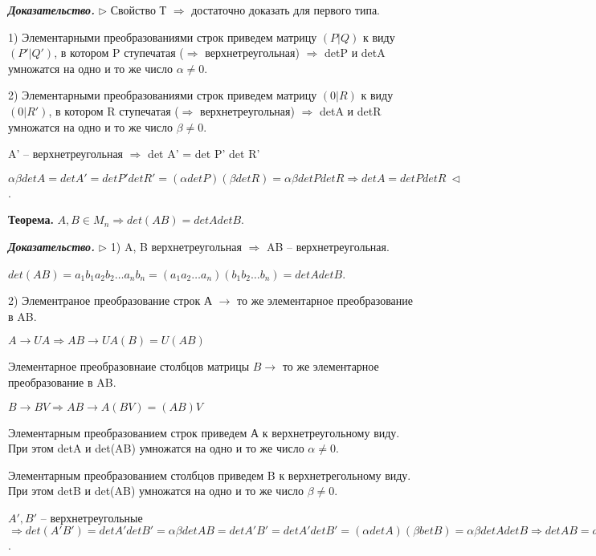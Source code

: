 \vspace{\baselineskip}
\textbf{\textit{Доказательство.}} $\rhd$ Свойство Т $\Rightarrow$ достаточно доказать для первого типа.

1) Элементарными преобразованиями строк приведем матрицу $(P|Q)$ к виду $(P'|Q')$, в котором P ступечатая ($\Rightarrow$ верхнетреугольная) $\Rightarrow$ detP и detA умножатся на одно и то же число $\alpha \neq 0$. 

2) Элементарными преобразованиями строк приведем матрицу $(0|R)$ к виду $(0|R')$, в котором R ступечатая ($\Rightarrow$ верхнетреугольная) $\Rightarrow$ detA и detR умножатся на одно и то же число $\beta \neq 0$. 

A' -- верхнетреугольная $\Rightarrow$ det A' = det P' det R'

$\alpha \beta det A = det A' = det P' det R' = (\alpha det P) (\beta det R) = \alpha \beta det P det R \Rightarrow det A = det P det R \ \lhd$.

\vspace{\baselineskip}
\textbf{Теорема.} $A, B \in M_n \Rightarrow det(AB) = detA detB$.

\vspace{\baselineskip}
\textbf{\textit{Доказательство.}} $\rhd$ 1) A, B верхнетреугольная $\Rightarrow$ AB -- верхнетреугольная.


$det(AB) = a_1 b_1 a_2 b_2 \dots a_n b_n = (a_1 a_2 \dots a_n)(b_1 b_2 \dots b_n) = det A det B$.

\vspace{\baselineskip}
2) Элементраное преобразование строк А $\rightarrow$ то же элементарное преобразование в AB.

$A \rightarrow UA \Rightarrow AB \rightarrow UA(B) = U(AB)$

Элементарное преобразовнаие столбцов матрицы $B \rightarrow$ то же элементарное преобразование в AB.

$B \rightarrow BV \Rightarrow AB \rightarrow A(BV) = (AB)V$

\vspace{\baselineskip}
Элементарным преобразованием строк приведем А к верхнетреугольному виду. При этом detA и det(AB) умножатся на одно и то же число $\alpha \neq 0$.

Элементарным преобразованием столбцов приведем B к верхнетрегольному виду. При этом detB и det(AB) умножатся на одно и то же число $\beta \neq 0$.


\vspace{\baselineskip}
$A', B'$ -- верхнетреугольные $\Rightarrow det(A'B') = detA' detB' = \alpha \beta detAB = detA'B' = detA' det B' = (\alpha det A)(\beta bet B) = \alpha \beta det A det B \Rightarrow detAB = detA detB \ \lhd$.

